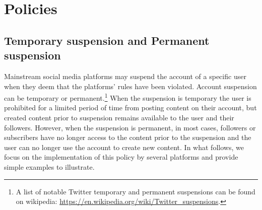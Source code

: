 \documentclass{article}
\begin{document}

\section{Policies}

\subsection{Temporary suspension and Permanent suspension}

Mainstream social media platforms may suspend the account of a specific user when they deem that the platforms' rules have been violated. Account suspension can be temporary or permanent.\footnote{A list of notable Twitter temporary and permanent suspensions can be found on wikipedia: \href{https://en.wikipedia.org/wiki/Twitter_suspensions}{https://en.wikipedia.org/wiki/Twitter\_suspensions}.}  When the suspension is temporary the user is prohibited for a limited period of time from posting content on their account, but created content prior to suspension remains available to the user and their followers. However, when the suspension is permanent, in most cases, followers or subscribers have no longer access to the content prior to the suspension and the user can no longer use the account to create new content.  In what follows, we focus on the implementation of this policy by several platforms and provide simple examples to illustrate. 
\end{document}
